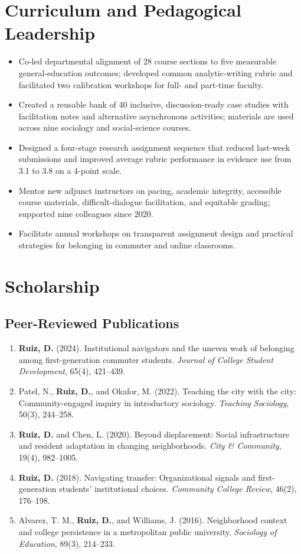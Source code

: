 \documentclass[10pt,letterpaper]{article}
\begin{document}
\section*{Curriculum and Pedagogical Leadership}

\begin{itemize}
  \item Co-led departmental alignment of 28 course sections to five measurable general-education outcomes; developed common analytic-writing rubric and facilitated two calibration workshops for full- and part-time faculty.
  \item Created a reusable bank of 40 inclusive, discussion-ready case studies with facilitation notes and alternative asynchronous activities; materials are used across nine sociology and social-science courses.
  \item Designed a four-stage research assignment sequence that reduced last-week submissions and improved average rubric performance in evidence use from 3.1 to 3.8 on a 4-point scale.
  \item Mentor new adjunct instructors on pacing, academic integrity, accessible course materials, difficult-dialogue facilitation, and equitable grading; supported nine colleagues since 2020.
  \item Facilitate annual workshops on transparent assignment design and practical strategies for belonging in commuter and online classrooms.
\end{itemize}

\section*{Scholarship}

\subsection*{Peer-Reviewed Publications}
\begin{enumerate}
  \item \textbf{Ruiz, D.} (2024). Institutional navigators and the uneven work of belonging among first-generation commuter students. \textit{Journal of College Student Development}, 65(4), 421--439.
  \item Patel, N., \textbf{Ruiz, D.}, and Okafor, M. (2022). Teaching the city with the city: Community-engaged inquiry in introductory sociology. \textit{Teaching Sociology}, 50(3), 244--258.
  \item \textbf{Ruiz, D.} and Chen, L. (2020). Beyond displacement: Social infrastructure and resident adaptation in changing neighborhoods. \textit{City \& Community}, 19(4), 982--1005.
  \item \textbf{Ruiz, D.} (2018). Navigating transfer: Organizational signals and first-generation students' institutional choices. \textit{Community College Review}, 46(2), 176--198.
  \item Alvarez, T. M., \textbf{Ruiz, D.}, and Williams, J. (2016). Neighborhood context and college persistence in a metropolitan public university. \textit{Sociology of Education}, 89(3), 214--233.
\end{enumerate}
\end{document}
